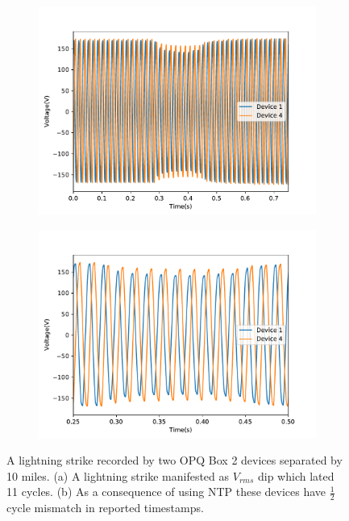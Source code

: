 \begin{figure}[h]
		\centering
	\begin{subfigure}{.5\textwidth}
	  \centering
	  \includegraphics[width=0.9\linewidth]{img/voltage_sag.pdf}
	  \caption{}
	  \label{fig6:sub1}
	\end{subfigure}%
	\begin{subfigure}{.5\textwidth}
	  \centering
	  \includegraphics[width=0.9\linewidth]{img/voltage_sag_zoomed_in.pdf}
	  \caption{}
	  \label{fig6:sub2}
	\end{subfigure}
	\caption{A lightning strike recorded by two OPQ Box 2 devices separated by 10 miles. (a) A lightning strike manifested as $V_{rms}$ dip which lated 11 cycles. (b) As a consequence of using NTP these devices have $\frac{1}{2}$ cycle mismatch in reported timestamps.}
	\label{fig:6}
\end{figure}

